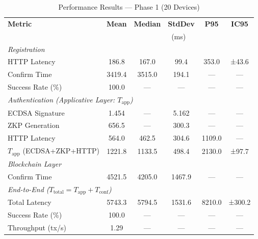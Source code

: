 %
%
\begin{table}[htbp]
\centering
\caption{Performance Results --- Phase 1 (20 Devices)}
\label{tab:phase1}
\begin{tabular}{lccccc}
\toprule
\textbf{Metric} & \textbf{Mean} & \textbf{Median} & \textbf{StdDev} & \textbf{P95} & \textbf{IC95} \\
                & \multicolumn{5}{c}{(ms)} \\
\midrule
\multicolumn{6}{l}{\textit{Registration}} \\
HTTP Latency      & 186.8 & 167.0 & 99.4 & 353.0 & ±43.6 \\
Confirm Time      & 3419.4 & 3515.0 & 194.1 & ---  & ---   \\
Success Rate (\%) & 100.0 & ---  & ---  & ---  & ---   \\
\midrule
\multicolumn{6}{l}{\textit{Authentication (Applicative Layer: $T_{\mathrm{app}}$)}} \\
ECDSA Signature   & 1.454 & ---  & 5.162 & ---  & ---   \\
ZKP Generation    & 656.5 & ---  & 300.3 & ---  & ---   \\
HTTP Latency      & 564.0 & 462.5 & 304.6 & 1109.0 & ---   \\
$T_{\mathrm{app}}$ (ECDSA+ZKP+HTTP) & 1221.8 & 1133.5 & 498.4 & 2130.0 & ±97.7 \\
\midrule
\multicolumn{6}{l}{\textit{Blockchain Layer}} \\
Confirm Time      & 4521.5 & 4205.0 & 1467.9 & ---  & ---   \\
\midrule
\multicolumn{6}{l}{\textit{End-to-End ($T_{\mathrm{total}} = T_{\mathrm{app}} + T_{\mathrm{conf}}$)}} \\
Total Latency     & 5743.3 & 5794.5 & 1531.6 & 8210.0 & ±300.2 \\
Success Rate (\%) & 100.0 & ---  & ---  & ---  & ---   \\
Throughput (tx/s) & 1.29 & ---  & ---  & ---  & ---   \\
\bottomrule
\end{tabular}
\end{table}

